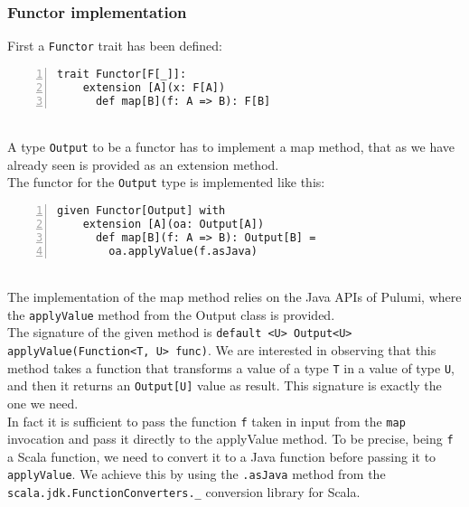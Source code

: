 \subsubsection{Functor implementation}
First a \texttt{Functor} trait has been defined:
\begin{lstlisting}[numbers=left, numberstyle=\tiny, numbersep=-5pt, stepnumber=1, linewidth=420pt]
  trait Functor[F[_]]:
    extension [A](x: F[A])
      def map[B](f: A => B): F[B]
\end{lstlisting}\mbox{}\\
A type \texttt{Output} to be a functor has to implement a map method, that as we have already seen is provided as an extension method.\\
The functor for the \texttt{Output} type is implemented like this:
\begin{lstlisting}[numbers=left, numberstyle=\tiny, numbersep=-5pt, stepnumber=1, linewidth=420pt]
  given Functor[Output] with
    extension [A](oa: Output[A])
      def map[B](f: A => B): Output[B] =
        oa.applyValue(f.asJava)
\end{lstlisting}\mbox{}\\
The implementation of the map method relies on the Java APIs of Pulumi, where the \texttt{applyValue} method from the Output class is provided.\\
The signature of the given method is \texttt{default <U> Output<U> applyValue(Function<T, U> func)}.
We are interested in observing that this method takes a function that transforms a value of a type \texttt{T} in a value of type \texttt{U}, and then it returns an \texttt{Output[U]} value as result.
This signature is exactly the one we need.\\
In fact it is sufficient to pass the function \texttt{f} taken in input from the \texttt{map} invocation and pass it directly to the applyValue method.
To be precise, being \texttt{f} a Scala function, we need to convert it to a Java function before passing it to \texttt{applyValue}.
We achieve this by using the \texttt{.asJava} method from the \texttt{scala.jdk.FunctionConverters.\_} conversion library for Scala.

